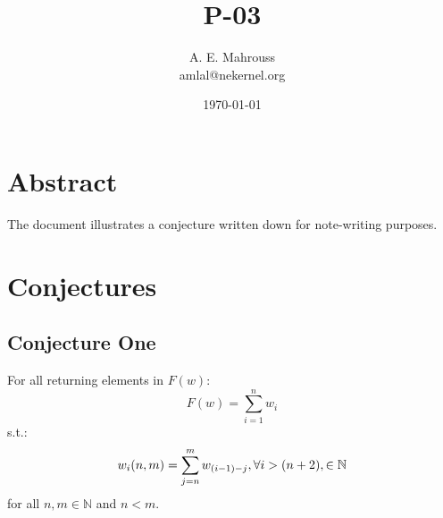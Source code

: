 \documentclass{article}
\title{P-03}
\author{A. E. Mahrouss\\amlal@nekernel.org}
\date{\today}
\begin{document}
\maketitle

\section{Abstract}

The document illustrates a conjecture written down for note-writing purposes.

\section{Conjectures}

\subsection{Conjecture One}
For all returning elements in $F(w)$:
\begin{equation}
    F(w) = \sum_{i=1}^{n} w_i
\end{equation}
s.t.:
\begin{equation}
    w_{i}(n, m) = \sum_{j=n}^{m} w_{(i-1)-j}, \space \forall i > (n+2), \in \mathbb{N}
\end{equation}
for all $n, m \in \mathbb{N}$ and $n < m$.
\end{document}
